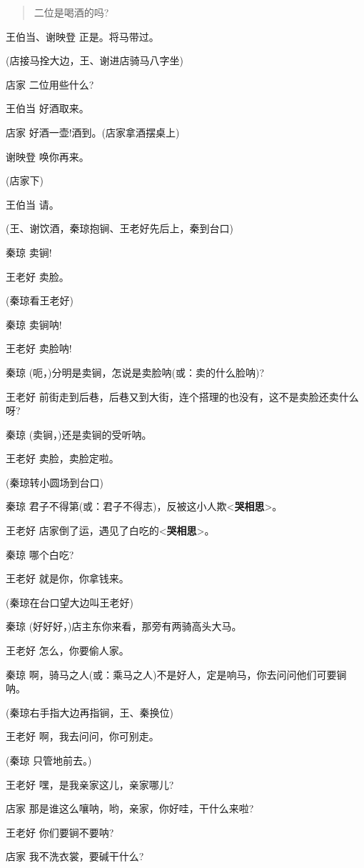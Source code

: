 \begin{quote}
二位是喝酒的吗?
\end{quote}

王伯当、谢映登 正是。将马带过。

(店接马拴大边，王、谢进店骑马八字坐)

店家 二位用些什么?

王伯当 好酒取来。

店家 好酒一壶!酒到。(店家拿酒摆桌上)

谢映登 唤你再来。

(店家下)

王伯当 请。

(王、谢饮酒，秦琼抱锏、王老好先后上，秦到台口)

秦琼 卖锏!

王老好 卖脸。

(秦琼看王老好)

秦琼 卖锏呐!

王老好 卖脸呐!

秦琼 (呃，)分明是卖锏，怎说是卖脸呐(或：卖的什么脸呐)?

王老好
前街走到后巷，后巷又到大街，连个搭理的也没有，这不是卖脸还卖什么呀?

秦琼 (卖锏，)还是卖锏的受听呐。

王老好 卖脸，卖脸定啦。

(秦琼转小圆场到台口)

秦琼
君子不得第(或：君子不得志)，反被这小人欺\textless{}\textbf{哭相思}\textgreater{}。

王老好
店家倒了运，遇见了白吃的\textless{}\textbf{哭相思}\textgreater{}。

秦琼 哪个白吃?

王老好 就是你，你拿钱来。

(秦琼在台口望大边叫王老好)

秦琼 (好好好，)店主东你来看，那旁有两骑高头大马。

王老好 怎么，你要偷人家。

秦琼
啊，骑马之人(或：乘马之人)不是好人，定是响马，你去问问他们可要锏呐。

(秦琼右手指大边再指锏，王、秦换位)

王老好 啊，我去问问，你可别走。

(秦琼 只管地前去。)

王老好 嘿，是我亲家这儿，亲家哪儿?

店家 那是谁这么嚷呐，哟，亲家，你好哇，干什么来啦?

王老好 你们要锏不要呐?

店家 我不洗衣裳，要碱干什么?

